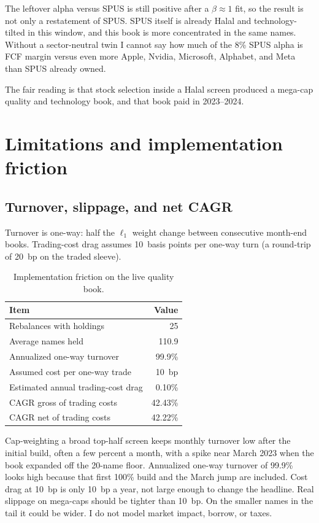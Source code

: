 \documentclass[11pt,letterpaper]{article}
\begin{document}
The leftover alpha versus SPUS is still positive after a $\beta \approx 1$ fit, so the result is not only a restatement of SPUS. SPUS itself is already Halal and technology-tilted in this window, and this book is more concentrated in the same names. Without a sector-neutral twin I cannot say how much of the 8\% SPUS alpha is FCF margin versus even more Apple, Nvidia, Microsoft, Alphabet, and Meta than SPUS already owned.

The fair reading is that stock selection inside a Halal screen produced a mega-cap quality and technology book, and that book paid in 2023--2024.

\section{Limitations and implementation friction}
\label{sec:limits}

\subsection{Turnover, slippage, and net CAGR}

Turnover is one-way: half the $\ell_1$ weight change between consecutive month-end books. Trading-cost drag assumes 10~basis points per one-way turn (a round-trip of 20~bp on the traded sleeve).

\begin{table}[htbp]
\centering
\caption{Implementation friction on the live quality book.}
\label{tab:friction}
\begin{tabular}{lr}
\toprule
Item & Value \\
\midrule
Rebalances with holdings              & 25 \\
Average names held                    & 110.9 \\
Annualized one-way turnover           & 99.9\% \\
Assumed cost per one-way trade        & 10~bp \\
Estimated annual trading-cost drag    & 0.10\% \\
CAGR gross of trading costs           & 42.43\% \\
CAGR net of trading costs             & 42.22\% \\
\bottomrule
\end{tabular}
\end{table}

Cap-weighting a broad top-half screen keeps monthly turnover low after the initial build, often a few percent a month, with a spike near March 2023 when the book expanded off the 20-name floor. Annualized one-way turnover of 99.9\% looks high because that first 100\% build and the March jump are included. Cost drag at 10~bp is only 10~bp a year, not large enough to change the headline. Real slippage on mega-caps should be tighter than 10~bp. On the smaller names in the tail it could be wider. I do not model market impact, borrow, or taxes.
\end{document}
